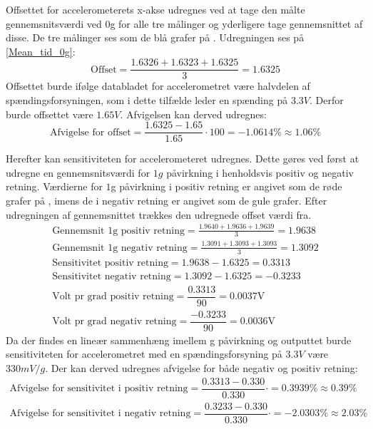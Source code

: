 Offsettet for accelerometerets x-akse udregnes ved at tage den målte gennemsnitsværdi ved $0$g for alle tre målinger og yderligere tage gennemsnittet af disse. De tre målinger ses som de blå grafer på . Udregningen ses på \ref{Mean_tid_0g}:
\begin{equation}\label{Mean_tid_0g}
\text{Offset} = \frac{1.6326 + 1.6323 + 1.6325}{3} = 1.6325
\end{equation}
\noindent Offsettet burde ifølge databladet for accelerometret være halvdelen af spændingsforsyningen, som i dette tilfælde leder en spænding på $3.3V$. \cite{Devices2009} Derfor burde offsettet være $1.65V$. Afvigelsen kan derved udregnes:
\begin{equation}
\text{Afvigelse for offset} = \dfrac{1.6325 - 1.65}{1.65} \cdot 100 = -1.0614\% \approx 1.06\%
\end{equation}

\noindent Herefter kan sensitiviteten for accelerometeret udregnes. Dette gøres ved først at udregne en gennemsnitsværdi for $1g$ påvirkning i henholdsvis positiv og negativ retning. Værdierne for $1$g påvirkning i positiv retning er angivet som de røde grafer på , imens de i negativ retning er angivet som de gule grafer. Efter udregningen af gennemsnittet trækkes den udregnede offset værdi fra.
\begin{align}
	\text{Gennemsnit 1g positiv retning} = \frac{1.9640 + 1.9636 + 1.9639}{3} = 1.9638 \\
	\text{Gennemsnit 1g negativ retning} = \frac{1.3091 + 1.3093 + 1.3093}{3} = 1.3092 \\
	\text{Sensitivitet positiv retning} = 1.9638 - 1.6325 = 0.3313 \\
	\text{Sensitivitet negativ retning} = 1.3092 - 1.6325 = -0.3233 \\
	\text{Volt pr grad positiv retning} = \dfrac{0.3313}{90} = 0.0037\text{V} \\
	\text{Volt pr grad negativ retning} = \dfrac{-0.3233}{90} = 0.0036\text{V}
\end{align}
\noindent Da der findes en lineær sammenhæng imellem g påvirkning og outputtet burde sensitiviteten for accelerometret med en spændingsforsyning på $3.3V$ være $330mV/g$. Der kan derved udregnes afvigelse for både negativ og positiv retning:
\begin{align}
	\text{Afvigelse for sensitivitet i positiv retning} = \dfrac{0.3313 - 0.330}{0.330} \cdot = 0.3939\% \approx 0.39\% \\
	\text{Afvigelse for sensitivitet i negativ retning} = \dfrac{0.3233 - 0.330}{0.330} \cdot = -2.0303\% \approx 2.03\%
\end{align}

